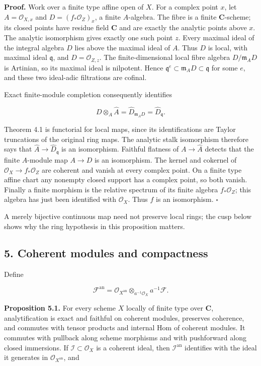 \documentclass[11pt]{article}
\begin{document}
\textbf{Proof.} Work over a finite type affine open of \(X\). For a
complex point \(x\), let \(A=\mathcal O_{X,x}\) and
\(D=(f_*\mathcal O_Z)_x\), a finite \(A\)-algebra. The fibre is a finite
\(\mathbf C\)-scheme; its closed points have residue field \(\mathbf C\)
and are exactly the analytic points above \(x\). The analytic
isomorphism gives exactly one such point \(z\). Every maximal ideal of
the integral algebra \(D\) lies above the maximal ideal of \(A\). Thus
\(D\) is local, with maximal ideal \(\mathfrak q\), and
\(D=\mathcal O_{Z,z}\). The finite-dimensional local fibre algebra
\(D/\mathfrak m_AD\) is Artinian, so its maximal ideal is nilpotent.
Hence \(\mathfrak q^e\subset\mathfrak m_AD\subset\mathfrak q\) for some
\(e\), and these two ideal-adic filtrations are cofinal.

Exact finite-module completion consequently identifies

\[
D\otimes_A\widehat A=\widehat D_{\mathfrak m_AD}
=\widehat D_{\mathfrak q}.
\]

Theorem 4.1 is functorial for local maps, since its identifications are
Taylor truncations of the original ring maps. The analytic stalk
isomorphism therefore says that
\(\widehat A\to\widehat D_{\mathfrak q}\) is an isomorphism. Faithful
flatness of \(A\to\widehat A\) detects that the finite \(A\)-module map
\(A\to D\) is an isomorphism. The kernel and cokernel of
\(\mathcal O_X\to f_*\mathcal O_Z\) are coherent and vanish at every
complex point. On a finite type affine chart any nonempty closed support
has a complex point, so both vanish. Finally a finite morphism is the
relative spectrum of its finite algebra \(f_*\mathcal O_Z\); this
algebra has just been identified with \(\mathcal O_X\). Thus \(f\) is an
isomorphism. \(\square\)

A merely bijective continuous map need not preserve local rings; the
cusp below shows why the ring hypothesis in this proposition matters.

\subsection{5. Coherent modules and
compactness}\label{coherent-modules-and-compactness}

Define

\[
\mathcal F^{\mathrm{an}}
=\mathcal O_{X^{\mathrm{an}}}\otimes_{a^{-1}\mathcal O_X}a^{-1}\mathcal F.
\]

\textbf{Proposition 5.1.} For every scheme \(X\) locally of finite type
over \(\mathbf C\), analytification is exact and faithful on coherent
modules, preserves coherence, and commutes with tensor products and
internal Hom of coherent modules. It commutes with pullback along scheme
morphisms and with pushforward along closed immersions. If
\(\mathcal I\subset\mathcal O_X\) is a coherent ideal, then
\(\mathcal I^{\mathrm{an}}\) identifies with the ideal it generates in
\(\mathcal O_{X^{\mathrm{an}}}\), and
\end{document}
